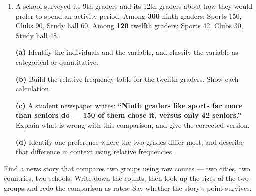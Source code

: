 \documentclass[12pt]{article}
\begin{document}
\begin{enumerate}[leftmargin=1.9em, itemsep=0.16in, resume]

  \item A school surveyed its 9th graders and its 12th graders about how they would prefer to
        spend an activity period. Among \textbf{300} ninth graders: Sports 150, Clubs 90,
        Study hall 60. Among \textbf{120} twelfth graders: Sports 42, Clubs 30, Study hall 48.

        \boxguard[17]
        \vspace{6pt}
        \textbf{(a)} Identify the individuals and the variable, and classify the variable as
        categorical or quantitative.\\[4pt]

        \boxguard[17]
        \vspace{6pt}
        \textbf{(b)} Build the relative frequency table for the twelfth graders. Show each
        calculation.\\[4pt]

        \boxguard[17]
        \vspace{6pt}
        \textbf{(c)} A student newspaper writes: \textbf{``Ninth graders like sports far more
        than seniors do --- 150 of them chose it, versus only 42 seniors.''} Explain what is
        wrong with this comparison, and give the corrected version.\\[4pt]

        \boxguard[17]
        \vspace{6pt}
        \textbf{(d)} Identify one preference where the two grades differ most, and describe
        that difference in context using relative frequencies.\\[4pt]

\end{enumerate}

\vspace{0.12in}

\boxguard[12]
\begin{extensionbox}
\small
Find a news story that compares two groups using raw counts --- two cities, two countries, two
schools. Write down the counts, then look up the sizes of the two groups and redo the
comparison as rates. Say whether the story's point survives.\\[4pt]
\end{extensionbox}

\vspace{0.12in}
\end{document}
